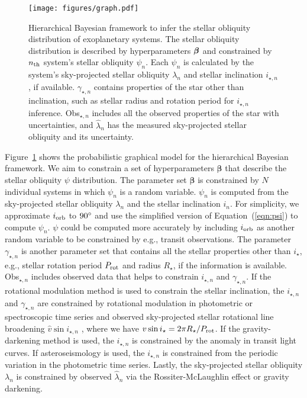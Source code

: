 \documentclass[twocolumn,times]{aastex631}
\begin{document}
\begin{figure}[ht!]
    \texttt{[image: figures/graph.pdf]}
    \caption{Hierarchical Bayesian framework to infer the stellar obliquity distribution of exoplanetary systems. The stellar obliquity distribution is described by hyperparameters $\vb*{\beta}$ and constrained by $n_{\rm th}$ system's stellar obliquity $\psi_n$. Each $\psi_n$ is calculated by the system's sky-projected stellar obliquity $\lambda_n$ and stellar inclination $i_{\star, n}$, if available. $\gamma_{\star, n}$ contains properties of the star other than inclination, such as stellar radius and rotation period for $i_{\star, n}$ inference. Obs$_{\star,n}$ includes all the observed properties of the star with uncertainties, and $\hat{\lambda}_n$ has the measured sky-projected stellar obliquity and its uncertainty.}
    \label{fig:graph}
\end{figure}

Figure~\ref{fig:graph} shows the probabilistic graphical model for the hierarchical Bayesian framework. We aim to constrain a set of hyperparameters $\bm{\beta}$ that describe the stellar obliquity $\psi$ distribution. The parameter set $\bm{\beta}$ is constrained by $N$ individual systems in which $\psi_n$ is a random variable. $\psi_n$ is computed from the sky-projected stellar obliquity $\lambda_n$ and the stellar inclination $i_n$. 
For simplicity, we approximate $i_{\rm orb}$ to $90\mbox{$^\circ$}$ and use the simplified version of Equation~(\ref{eqn:psi}) to compute $\psi_n$. $\psi$ could be computed more accurately by including $i_{\rm orb}$ as another random variable to be constrained by e.g., transit observations.
The parameter $\gamma_{\star, n}$ is another parameter set that contains all the stellar properties other than $i_\star$, e.g., stellar rotation period $P_{\rm rot}$ and radius $R_\star$, if the information is available.
Obs$_{\star,n}$ includes observed data that helps to constrain $i_{\star,n}$ and $\gamma_{\star, n}$.
If the rotational modulation method is used to constrain the stellar inclination, the $i_{\star,n}$ and $\gamma_{\star,n}$ are constrained by rotational modulation in photometric or spectroscopic time series and observed sky-projected stellar rotational line broadening $\hat{v}\sin{i_{\star,n}}$ \citep[e.g.,][]{Masuda20}, where we have $v\sin{i_\star} = 2 \pi R_\star / P_{\rm rot}$.
If the gravity-darkening method is used, the $i_{\star,n}$ is constrained by the anomaly in transit light curves. If asteroseismology is used, the $i_{\star,n}$ is constrained from the periodic variation in the photometric time series.
Lastly, the sky-projected stellar obliquity $\lambda_n$ is constrained by observed $\hat{\lambda}_n$ via the Rossiter-McLaughlin effect or gravity darkening.
\end{document}
